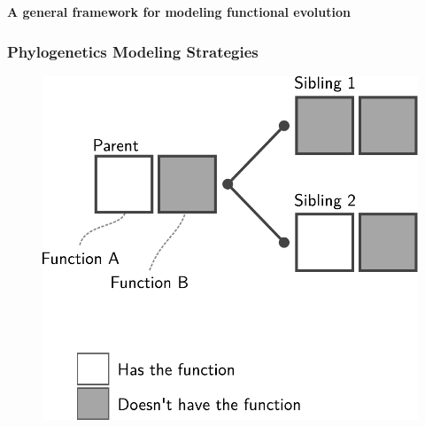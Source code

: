\documentclass[aspectratio=169, 9pt]{beamer}
\begin{document}
\begin{frame}[t]
	\textcolor{uscgold}{
		\Large {\bf A general framework for modeling functional evolution} 
	}
\end{frame}


\begin{frame}[label=aphylo-current]
	\frametitle{Phylogenetics Modeling Strategies}
	
	\begin{minipage}[m]{.3\linewidth}
		
		\begin{figure}
			\includegraphics[width=.9\linewidth]{phylo-model-overview-legend.pdf}
		\end{figure}
		
	\end{minipage}\hfill
	\begin{minipage}[m]{.69\linewidth}
		

\end{minipage}
\end{frame}
\end{document}
